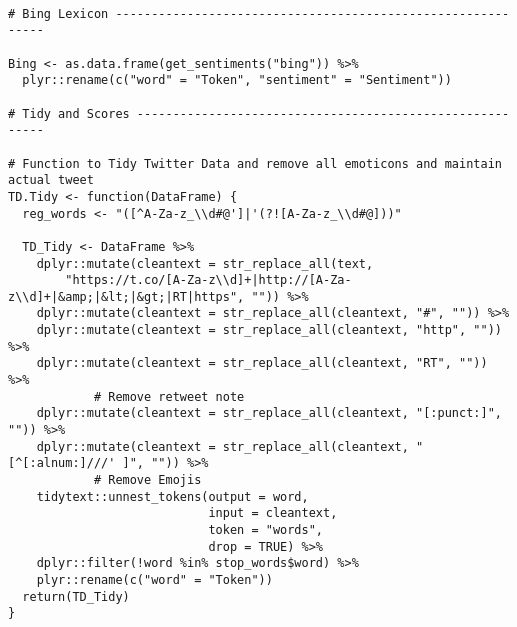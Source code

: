 \begin{lstlisting}

# Bing Lexicon ------------------------------------------------------------

Bing <- as.data.frame(get_sentiments("bing")) %>% 
  plyr::rename(c("word" = "Token", "sentiment" = "Sentiment"))
  
# Tidy and Scores ---------------------------------------------------------

# Function to Tidy Twitter Data and remove all emoticons and maintain actual tweet
TD.Tidy <- function(DataFrame) {
  reg_words <- "([^A-Za-z_\\d#@']|'(?![A-Za-z_\\d#@]))"
  
  TD_Tidy <- DataFrame %>%
    dplyr::mutate(cleantext = str_replace_all(text, 
    	"https://t.co/[A-Za-z\\d]+|http://[A-Za-z\\d]+|&amp;|&lt;|&gt;|RT|https", "")) %>% 
    dplyr::mutate(cleantext = str_replace_all(cleantext, "#", "")) %>% 
    dplyr::mutate(cleantext = str_replace_all(cleantext, "http", "")) %>% 
    dplyr::mutate(cleantext = str_replace_all(cleantext, "RT", "")) %>% 
    		# Remove retweet note
    dplyr::mutate(cleantext = str_replace_all(cleantext, "[:punct:]", "")) %>% 
    dplyr::mutate(cleantext = str_replace_all(cleantext, "[^[:alnum:]///' ]", "")) %>%  
    		# Remove Emojis
    tidytext::unnest_tokens(output = word, 
                            input = cleantext, 
                            token = "words", 
                            drop = TRUE) %>% 
    dplyr::filter(!word %in% stop_words$word) %>% 
    plyr::rename(c("word" = "Token"))
  return(TD_Tidy)
}


\end{lstlisting}
